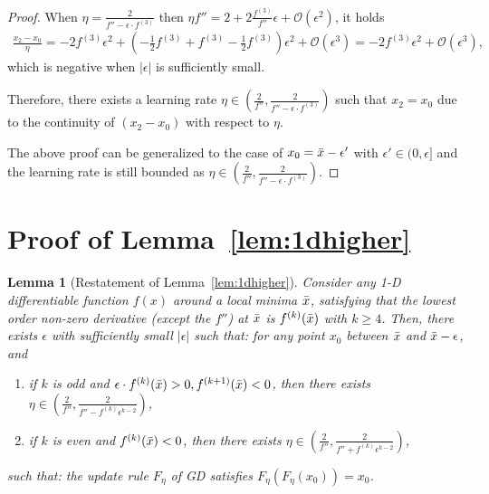 \documentclass{article}
\theoremstyle{plain}
\newtheorem{lemma}{Lemma}
\theoremstyle{remark}
\newcommand{\red}[1]{{\color{black}#1}}
\newcommand{\T}[1]{^{(#1)}}
\def\O{\mathcal{O}}
\begin{document}
\begin{proof}
When $\eta=\frac{2}{f''-\epsilon\cdot f\T{3}}$ then $\eta f'' = 2+2\frac{f\T{3}}{f''}\epsilon+\O(\epsilon^2)$, it holds
\begin{align}
    \frac{x_2-x_0}{\eta} = -2f\T{3}\epsilon^2+\left(-\frac{1}{2}f\T{3}+f\T{3}-\frac{1}{2}f\T{3}\right)\epsilon^2 + \O(\epsilon^3)
    =-2f\T{3}\epsilon^2 + \O(\epsilon^3),
\end{align}
which is negative  when $|\epsilon|$ is sufficiently small.

Therefore, there exists a learning rate $\eta\in(\frac{2}{f''}, \frac{2}{f''-\epsilon\cdot f\T{3}})$ such that $x_2=x_0$ due to the continuity of $(x_2-x_0)$ with respect to $\eta$.

The above proof can be generalized to the case of $x_0=\Bar{x}-\epsilon'$ with $\epsilon'\in(0,\epsilon]$ and the learning rate is still bounded as $\eta\in(\frac{2}{f''}, \frac{2}{f''-\epsilon\cdot f\T{3}})$.
\end{proof}

\section{Proof of Lemma~\ref{lem:1dhigher}}
\label{app:1dhigher}

\begin{lemma}[Restatement of Lemma~\ref{lem:1dhigher}]
Consider any 1-D differentiable function $f(x)$ around a local minima $\Bar{x}$, satisfying that the lowest order non-zero derivative (except the $f''$) at $\Bar{x}$ is $f\T{k}(\Bar{x})$ with $k\ge 4$. Then, there exists $\epsilon$ with sufficiently small $|\epsilon|$ such that: for any point $x_0$ between $\Bar{x}$ and $\Bar{x}-\epsilon$, and
\begin{enumerate}
    \item if $k$ is odd and $\epsilon\cdot f\T{k}(\Bar{x})>0, f\T{k+1}(\Bar{x})<0$, 
    then there exists $\eta\in(\frac{2}{f''}, \frac{2}{f''-f\T{k}\epsilon^{k-2}})$,
    \item if $k$ is even and $f\T{k}(\Bar{x})<0$, then there exists $\eta\in(\frac{2}{f''}, \frac{2}{f''+f\T{k}\epsilon^{k-2}})$,
\end{enumerate}
such that: the update rule $F_\eta$ of GD satisfies $F_\eta(F_\eta(x_0))=x_0$.
\end{lemma}
\end{document}
